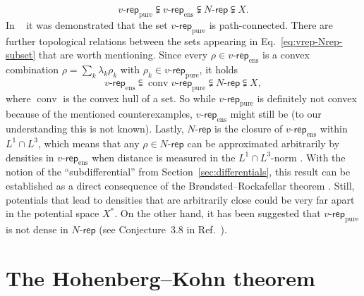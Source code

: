 \documentclass[journal=apcach,manuscript=article,layout=twocolumn]{achemso}
\newcommand{\vrep}{\ensuremath{v\text{-}\mathsf{rep}}}
\newcommand{\vreppure}{\ensuremath{\vrep_\mathrm{pure}}}
\newcommand{\vrepens}{\ensuremath{\vrep_\mathrm{ens}}}
\newcommand{\Nrep}{\ensuremath{N\text{-}\mathsf{rep}}}
\DeclareMathOperator{\conv}{conv}
\begin{document}
\begin{equation}\label{eq:vrep-Nrep-subset}
    \vreppure \subsetneqq \vrepens \subsetneqq \Nrep \subsetneqq X.
\end{equation}
In \citeauthor{Garrigue2021}~\cite{Garrigue2021} it was demonstrated that the set $\vreppure$ 
is path-connected. There are further topological relations between the sets appearing in Eq.~\eqref{eq:vrep-Nrep-subset} that are worth mentioning. Since every $\rho\in\vrepens$ is a convex combination $\rho=\sum_k\lambda_k\rho_k$ with $\rho_k\in\vreppure$, it holds
\begin{equation*}%
    \vrepens \subseteqq \conv\vreppure \subsetneqq \Nrep \subsetneqq X,
\end{equation*}
where $\conv$ is the convex hull of a set. So while $\vreppure$ is definitely not convex because of the mentioned counterexamples, $\vrepens$ might still be (to our understanding this is not known). Lastly, $\Nrep$ is the closure of $\vrepens$ within $L^1\cap L^3$, which means that any $\rho\in\Nrep$ can be approximated arbitrarily by densities in $\vrepens$ when distance is measured in the $L^1\cap L^3$-norm \cite[Theorem~3.14]{Lieb1983}. With the notion of the ``subdifferential'' from Section~\ref{sec:differentials}, this result can be established as a direct consequence of the Br{\o}ndsted--Rockafellar theorem \cite[Corollary~2.44]{Barbu-Precupanu}. Still, potentials that lead to densities that are arbitrarily close could be very far apart in the potential space $X^*$.
On the other hand, it has been suggested that $\vreppure$ is not dense in $\Nrep$ (see Conjecture~3.8 in Ref.~).


\section{The Hohenberg--Kohn theorem}
\label{sec:HK}
\end{document}

